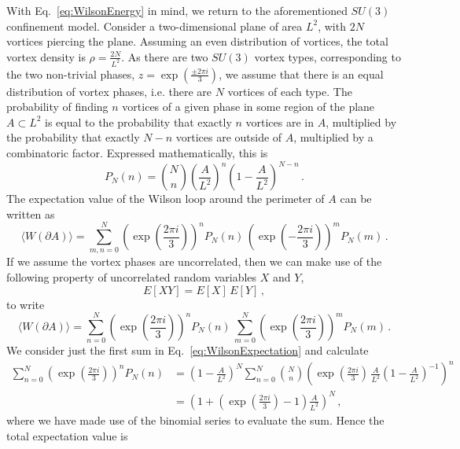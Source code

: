 With Eq.~\ref{eq:WilsonEnergy} in mind, we return to the aforementioned $SU(3)$ confinement model. Consider a two-dimensional plane of area $L^2$, with $2N$ vortices piercing the plane. Assuming an even distribution of vortices, the total vortex density is $\rho = \frac{2N}{L^2}$. As there are two $SU(3)$ vortex types, corresponding to the two non-trivial phases, $z=\exp\left(\frac{\pm 2\pi i}{3}\right)$, we assume that there is an equal distribution of vortex phases, i.e. there are $N$ vortices of each type. The probability of finding $n$ vortices of a given phase in some region of the plane $A\subset L^2$ is equal to the probability that exactly $n$ vortices are in $A$, multiplied by the probability that exactly $N-n$ vortices are outside of $A$, multiplied by a combinatoric factor. Expressed mathematically, this is
%
\begin{equation}
P_N(n) = \binom{N}{n} \left(\frac{A}{L^2}\right)^n \left(1-\frac{A}{L^2}\right)^{N-n}\, .
\end{equation}
%
The expectation value of the Wilson loop around the perimeter of $A$ can be written as
%
\begin{equation}
\langle W(\partial A)\rangle = \sum_{m,n = 0}^N \left(\exp\left(\frac{2\pi i}{3}\right)\right)^n P_N(n)\, \left(\exp\left(-\frac{2\pi i}{3}\right)\right)^m P_N(m)\, .
\end{equation}
%
If we assume the vortex phases are uncorrelated, then we can make use of the following property of uncorrelated random variables $X$ and $Y$,
%
\begin{equation}
E[XY] = E[X]\, E[Y]\, ,
\end{equation}
%
to write
%
\begin{equation}
\langle W(\partial A)\rangle = \sum_{n=0}^N \left(\exp\left(\frac{2\pi i}{3}\right)\right)^n P_N(n)\,\sum_{m=0}^N \left(\exp\left(\frac{2\pi i}{3}\right)\right)^m P_N(m)\, .
\label{eq:WilsonExpectation}
\end{equation}
%
We consider just the first sum in Eq.~\ref{eq:WilsonExpectation} and calculate
%
\begin{align*}
\sum_{n=0}^N \left(\exp\left(\frac{2\pi i}{3}\right)\right)^n P_N(n) & = \left(1-\frac{A}{L^2}\right)^{N}\sum_{n=0}^{N} \binom{N}{n} \left(\exp\left(\frac{2\pi i}{3}\right)\,\frac{A}{L^2}\left(1-\frac{A}{L^2}\right)^{-1}\right)^n\\
&=\left(1+\left(\exp\left(\frac{2\pi i}{3}\right) - 1\right)\frac{A}{L^2}\right)^N\, ,
\end{align*}
%
where we have made use of the binomial series to evaluate the sum. Hence the total expectation value is
